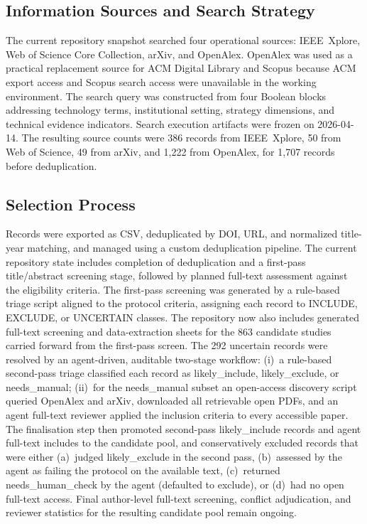 \documentclass[journal]{IEEEtran}
\begin{document}
\subsection{Information Sources and Search Strategy}

The current repository snapshot searched four operational sources: IEEE~Xplore, Web of Science Core Collection, arXiv, and OpenAlex.
OpenAlex was used as a practical replacement source for ACM Digital Library and Scopus because ACM export access and Scopus search access were unavailable in the working environment.
The search query was constructed from four Boolean blocks addressing technology terms, institutional setting, strategy dimensions, and technical evidence indicators.
Search execution artifacts were frozen on 2026-04-14.
The resulting source counts were 386 records from IEEE~Xplore, 50 from Web of Science, 49 from arXiv, and 1,222 from OpenAlex, for 1,707 records before deduplication.

\subsection{Selection Process}

Records were exported as CSV, deduplicated by DOI, URL, and normalized title-year matching, and managed using a custom deduplication pipeline.
The current repository state includes completion of deduplication and a first-pass title/abstract screening stage, followed by planned full-text assessment against the eligibility criteria.
The first-pass screening was generated by a rule-based triage script aligned to the protocol criteria, assigning each record to INCLUDE, EXCLUDE, or UNCERTAIN classes.
The repository now also includes generated full-text screening and data-extraction sheets for the 863 candidate studies carried forward from the first-pass screen.
The 292 uncertain records were resolved by an agent-driven, auditable two-stage workflow: (i)~a rule-based second-pass triage classified each record as likely\_include, likely\_exclude, or needs\_manual; (ii)~for the needs\_manual subset an open-access discovery script queried OpenAlex and arXiv, downloaded all retrievable open PDFs, and an agent full-text reviewer applied the inclusion criteria to every accessible paper.
The finalisation step then promoted second-pass likely\_include records and agent full-text includes to the candidate pool, and conservatively excluded records that were either (a)~judged likely\_exclude in the second pass, (b)~assessed by the agent as failing the protocol on the available text, (c)~returned needs\_human\_check by the agent (defaulted to exclude), or (d)~had no open full-text access.
Final author-level full-text screening, conflict adjudication, and reviewer statistics for the resulting candidate pool remain ongoing.
\end{document}
